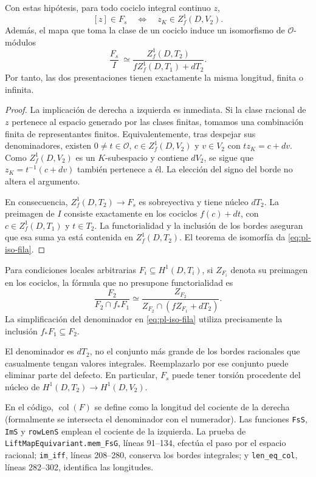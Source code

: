 \begin{proposicion}
\label{prop:pl-presentacion-fila}
Con estas hipótesis, para todo cociclo integral continuo $z$,
\[
 [z]\in F_s\quad\Longleftrightarrow\quad z_K\in Z_f^1(D,V_2).
\]
Además, el mapa que toma la clase de un cociclo induce un
isomorfismo de $\mathcal O$-módulos
\begin{equation}
 \frac{F_s}{I}\ \simeq
 \frac{Z_f^1(D,T_2)}{fZ_f^1(D,T_1)+dT_2}.
 \label{eq:pl-iso-fila}
\end{equation}
Por tanto, las dos presentaciones tienen exactamente la misma
longitud, finita o infinita.
\end{proposicion}
\begin{proof}
La implicación de derecha a izquierda es inmediata. Si la clase
racional de $z$ pertenece al espacio generado por las clases
finitas, tomamos una combinación finita de representantes finitos.
Equivalentemente, tras despejar sus denominadores, existen
$0\ne t\in\mathcal O$, $c\in Z_f^1(D,V_2)$ y $v\in V_2$ con
$tz_K=c+d v$. Como $Z_f^1(D,V_2)$ es un $K$-subespacio y contiene
$dV_2$, se sigue que $z_K=t^{-1}(c+d v)$ también pertenece a él.
La elección del signo del borde no altera el argumento.

En consecuencia, $Z_f^1(D,T_2)\to F_s$ es sobreyectiva y tiene
núcleo $dT_2$. La preimagen de $I$ consiste exactamente en los
cociclos $f(c)+dt$, con $c\in Z_f^1(D,T_1)$ y $t\in T_2$.
La functorialidad y la inclusión de los bordes aseguran que esa
suma ya está contenida en $Z_f^1(D,T_2)$. El teorema de isomorfía
da \eqref{eq:pl-iso-fila}.
\end{proof}

Para condiciones locales arbitrarias $F_i\subseteq H^1(D,T_i)$,
si $Z_{F_i}$ denota su preimagen en los cociclos, la fórmula que
no presupone functorialidad es
\[
 \frac{F_2}{F_2\cap f_*F_1}\simeq
 \frac{Z_{F_2}}{Z_{F_2}\cap(fZ_{F_1}+dT_2)}.
\]
La simplificación del denominador en \eqref{eq:pl-iso-fila}
utiliza precisamente la inclusión $f_*F_1\subseteq F_2$.

El denominador es $dT_2$, no el conjunto más grande de los bordes
racionales que casualmente tengan valores integrales. Reemplazarlo
por ese conjunto puede eliminar parte del defecto. En particular,
$F_s$ puede tener torsión procedente del núcleo de
$H^1(D,T_2)\to H^1(D,V_2)$.

En el código, $\operatorname{col}(F)$ se define como la longitud
del cociente de la derecha (formalmente se intersecta el
denominador con el numerador). Las funciones
\texttt{FsS}, \texttt{ImS} y \texttt{rowLenS} emplean el cociente
de la izquierda. La prueba de \texttt{LiftMapEquivariant.mem\_FsG},
líneas 91--134, efectúa el paso por el espacio racional;
\texttt{im\_iff}, líneas 208--280, conserva los bordes integrales;
y \texttt{len\_eq\_col}, líneas 282--302, identifica las longitudes.

